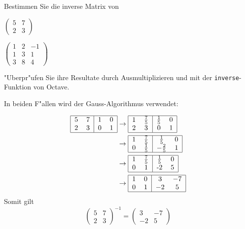 Bestimmen Sie die inverse Matrix von
\begin{teilaufgaben}
\item
$
\begin{pmatrix}
5&7\\
2&3
\end{pmatrix}
$
\item
$
\begin{pmatrix}
1&2&-1\\
1&3&1\\
3&8&4
\end{pmatrix}
$
\end{teilaufgaben}
"Uberpr"ufen Sie ihre Resultate durch Ausmultiplizieren und mit der
{\tt inverse}-Funktion von Octave.

\begin{loesung}
In beiden F"allen wird der Gauss-Algorithmus verwendet:
\begin{teilaufgaben}
\item
\begin{align*}
\begin{tabular}{|cc|cc|}
\hline
5&7&1&0\\
2&3&0&1\\
\hline
\end{tabular}
&
\rightarrow
\begin{tabular}{|cc|cc|}
\hline
1&$\frac75$&$\frac15$&0\\
2&3&0&1\\
\hline
\end{tabular}
\\
&
\rightarrow
\begin{tabular}{|cc|cc|}
\hline
1&$\frac75$&$\frac15$&0\\
0&$\frac15$&$-\frac25$&1\\
\hline
\end{tabular}
\\
&
\rightarrow
\begin{tabular}{|cc|cc|}
\hline
1&$\frac75$&$\frac15$&0\\
0&1&-2&5\\
\hline
\end{tabular}
\\
&
\rightarrow
\begin{tabular}{|cc|cc|}
\hline
1&0&3&$-7$\\
0&1&$-2$&5\\
\hline
\end{tabular}
\end{align*}
Somit gilt
\[
\begin{pmatrix}
5&7\\
2&3
\end{pmatrix}^{-1}=
\begin{pmatrix}
3&-7\\-2&5
\end{pmatrix}
\]


\end{teilaufgaben}
\end{loesung}
